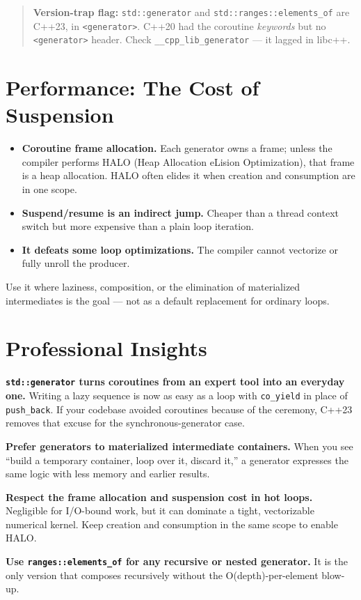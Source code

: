\begin{quote}
\textbf{Version-trap flag:} \lstinline|std::generator| and \lstinline|std::ranges::elements_of| are C++23, in \lstinline|<generator>|. C++20 had the coroutine \emph{keywords} but no \lstinline|<generator>| header. Check \lstinline|__cpp_lib_generator| --- it lagged in libc++.
\end{quote}

\section{Performance: The Cost of Suspension}

\begin{itemize}
    \item \textbf{Coroutine frame allocation.} Each generator owns a frame; unless the compiler performs HALO (Heap Allocation eLision Optimization), that frame is a heap allocation. HALO often elides it when creation and consumption are in one scope.
    \item \textbf{Suspend/resume is an indirect jump.} Cheaper than a thread context switch but more expensive than a plain loop iteration.
    \item \textbf{It defeats some loop optimizations.} The compiler cannot vectorize or fully unroll the producer.
\end{itemize}

Use it where laziness, composition, or the elimination of materialized intermediates is the goal --- not as a default replacement for ordinary loops.

\section{Professional Insights}

\textbf{\lstinline|std::generator| turns coroutines from an expert tool into an everyday one.} Writing a lazy sequence is now as easy as a loop with \lstinline|co_yield| in place of \lstinline|push_back|. If your codebase avoided coroutines because of the ceremony, C++23 removes that excuse for the synchronous-generator case.

\textbf{Prefer generators to materialized intermediate containers.} When you see ``build a temporary container, loop over it, discard it,'' a generator expresses the same logic with less memory and earlier results.

\textbf{Respect the frame allocation and suspension cost in hot loops.} Negligible for I/O-bound work, but it can dominate a tight, vectorizable numerical kernel. Keep creation and consumption in the same scope to enable HALO.

\textbf{Use \lstinline|ranges::elements_of| for any recursive or nested generator.} It is the only version that composes recursively without the O(depth)-per-element blow-up.
